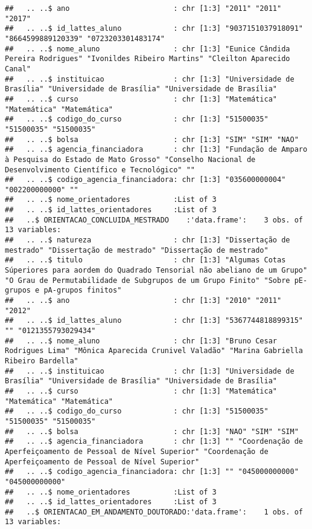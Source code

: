\documentclass[]{article}
\begin{document}
\begin{verbatim}
##   .. ..$ ano                        : chr [1:3] "2011" "2011" "2017"
##   .. ..$ id_lattes_aluno            : chr [1:3] "9037151037918091" "8664599889120339" "0723203301483174"
##   .. ..$ nome_aluno                 : chr [1:3] "Eunice Cândida Pereira Rodrigues" "Ivonildes Ribeiro Martins" "Cleilton Aparecido Canal"
##   .. ..$ instituicao                : chr [1:3] "Universidade de Brasília" "Universidade de Brasília" "Universidade de Brasília"
##   .. ..$ curso                      : chr [1:3] "Matemática" "Matemática" "Matemática"
##   .. ..$ codigo_do_curso            : chr [1:3] "51500035" "51500035" "51500035"
##   .. ..$ bolsa                      : chr [1:3] "SIM" "SIM" "NAO"
##   .. ..$ agencia_financiadora       : chr [1:3] "Fundação de Amparo à Pesquisa do Estado de Mato Grosso" "Conselho Nacional de Desenvolvimento Científico e Tecnológico" ""
##   .. ..$ codigo_agencia_financiadora: chr [1:3] "035600000004" "002200000000" ""
##   .. ..$ nome_orientadores          :List of 3
##   .. ..$ id_lattes_orientadores     :List of 3
##   ..$ ORIENTACAO_CONCLUIDA_MESTRADO    :'data.frame':    3 obs. of  13 variables:
##   .. ..$ natureza                   : chr [1:3] "Dissertação de mestrado" "Dissertação de mestrado" "Dissertação de mestrado"
##   .. ..$ titulo                     : chr [1:3] "Algumas Cotas Súperiores para aordem do Quadrado Tensorial não abeliano de um Grupo" "O Grau de Permutabilidade de Subgrupos de um Grupo Finito" "Sobre pE-grupos e pA-grupos finitos"
##   .. ..$ ano                        : chr [1:3] "2010" "2011" "2012"
##   .. ..$ id_lattes_aluno            : chr [1:3] "5367744818899315" "" "0121355793029434"
##   .. ..$ nome_aluno                 : chr [1:3] "Bruno Cesar Rodrigues Lima" "Mônica Aparecida Crunivel Valadão" "Marina Gabriella Ribeiro Bardella"
##   .. ..$ instituicao                : chr [1:3] "Universidade de Brasília" "Universidade de Brasília" "Universidade de Brasília"
##   .. ..$ curso                      : chr [1:3] "Matemática" "Matemática" "Matemática"
##   .. ..$ codigo_do_curso            : chr [1:3] "51500035" "51500035" "51500035"
##   .. ..$ bolsa                      : chr [1:3] "NAO" "SIM" "SIM"
##   .. ..$ agencia_financiadora       : chr [1:3] "" "Coordenação de Aperfeiçoamento de Pessoal de Nível Superior" "Coordenação de Aperfeiçoamento de Pessoal de Nível Superior"
##   .. ..$ codigo_agencia_financiadora: chr [1:3] "" "045000000000" "045000000000"
##   .. ..$ nome_orientadores          :List of 3
##   .. ..$ id_lattes_orientadores     :List of 3
##   ..$ ORIENTACAO_EM_ANDAMENTO_DOUTORADO:'data.frame':    1 obs. of  13 variables:

\end{verbatim}
\end{document}
